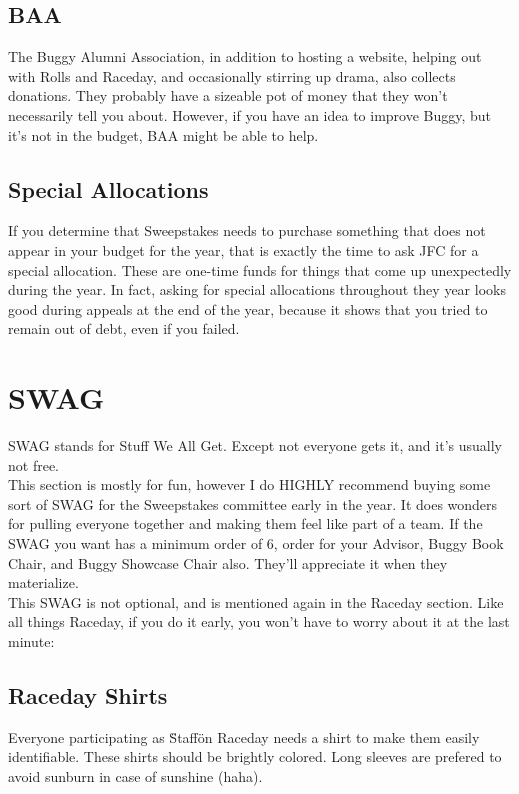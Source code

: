 \subsection{BAA}
The Buggy Alumni Association, in addition to hosting a website, helping
out with Rolls and Raceday, and occasionally stirring up drama, also collects
donations. They probably have a sizeable pot of money that they won't
necessarily tell you about. However, if you have an idea to improve Buggy,
but it's not in the budget, BAA might be able to help.

\subsection{Special Allocations}
If you determine that Sweepstakes needs to purchase something that does
not appear in your budget for the year, that is exactly the time to ask
JFC for a special allocation. These are one-time funds for things that come
up unexpectedly during the year. In fact, asking for special allocations
throughout they year looks good during appeals at the end of the year,
because it shows that you tried to remain out of debt, even if you failed.

\section{SWAG}
SWAG stands for Stuff We All Get. Except not everyone gets it, and it's
usually not free.
\\
This section is mostly for fun, however I do HIGHLY recommend buying some
sort of SWAG for the Sweepstakes committee early in the year. It does
wonders for pulling everyone together and making them feel like part of a
team. If the SWAG you want has a minimum order of 6, order for your Advisor,
Buggy Book Chair, and Buggy Showcase Chair also. They'll appreciate it
when they materialize.
\\
This SWAG is not optional, and is mentioned again in the Raceday section.
Like all things Raceday, if you do it early, you won't have to worry about it
at the last minute:

\subsection{Raceday Shirts}
Everyone participating as \"Staff\" on Raceday needs a shirt to make them
easily identifiable. These shirts should be brightly colored. Long sleeves
are prefered to avoid sunburn in case of sunshine (haha).

